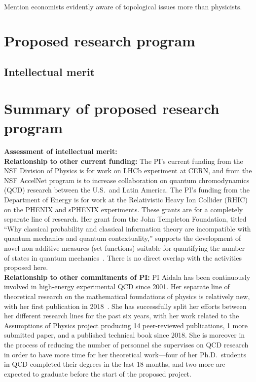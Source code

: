 Mention economists evidently aware of topological issues more than physicists.



\section{Proposed research program}

\subsection{Intellectual merit}



\section{Summary of proposed research program}


\noindent
\textbf{Assessment of intellectual merit:} \\

\noindent
\textbf{Relationship to other current funding:} The PI's current funding from the NSF Division of Physics is for work on LHCb experiment at CERN, and from the NSF AccelNet program is to increase collaboration on quantum chromodynamics (QCD) research between the U.S.~and Latin America.  The PI's funding from the Department of Energy is for work at the Relativistic Heavy Ion Collider (RHIC) on the PHENIX and sPHENIX experiments.  These grants are for a completely separate line of research. Her grant from the John Templeton Foundation, titled ``Why classical probability and classical information theory are incompatible with quantum mechanics and quantum contextuality,'' supports the development of novel non-additive measures (set functions) suitable for quantifying the number of states in quantum mechanics~\cite{aop-nonaddmeas}.  There is no direct overlap with the activities proposed here.  \\

\noindent
\textbf{Relationship to other commitments of PI:} PI Aidala has been continuously involved in high-energy experimental QCD since 2001.  Her separate line of theoretical research on the mathematical foundations of physics is relatively new, with her first publication in 2018~\cite{aop-phys-blueprint}. She has successfully split her efforts between her different research lines for the past six years, with her work related to the Assumptions of Physics project producing 14 peer-reviewed publications, 1 more submitted paper, and a published technical book since 2018.  She is moreover in the process of reducing the number of personnel she supervises on QCD research in order to have more time for her theoretical work---four of her Ph.D.~students in QCD completed their degrees in the last 18 months, and two more are expected to graduate before the start of the proposed project.  




